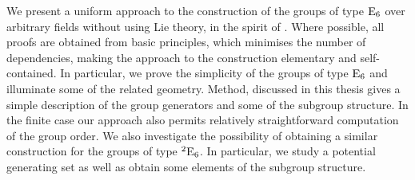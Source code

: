 


\begin{abstracts}        %

We present a uniform approach to the construction of the groups of type $\mathord{\mathrm{E}}_6$ over arbitrary fields without using Lie theory, in
the spirit of \cite{WilsonBook}. Where possible, all proofs are obtained from basic principles, which minimises the number of dependencies, 
making the approach to the construction elementary and self-contained. In particular, we prove the simplicity of the groups of type 
$\mathord{\mathrm{E}}_6$ and illuminate some of the related geometry. Method, discussed in this thesis gives a simple description of the 
group generators and some of the subgroup structure. In the finite case our approach also permits relatively straightforward 
computation of the group order. We also investigate the possibility of obtaining a similar construction for the groups of type ${}^2\mathord{\mathrm{E}}_6$. 
In particular, we 
study a potential generating set as well as obtain some elements of the subgroup structure. 


\end{abstracts}




